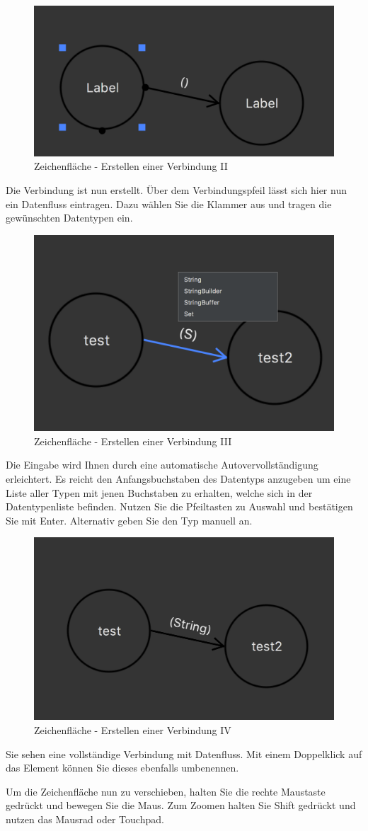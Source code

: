 \begin{figure}[H]
	\centering
	\includegraphics[width=.4\textwidth]{Zeichenflaeche_Basics2.png}
	\caption{Zeichenfläche - Erstellen einer Verbindung II}	
\end{figure}
Die Verbindung ist nun erstellt. Über dem Verbindungspfeil lässt sich hier nun ein Datenfluss eintragen. Dazu wählen Sie die Klammer aus und tragen die gewünschten Datentypen ein. 

\begin{figure}[H]
	\centering
	\includegraphics[width=.4\textwidth]{Zeichenflaeche_Basics3.png}
	\caption{Zeichenfläche - Erstellen einer Verbindung III}	
\end{figure}
Die Eingabe wird Ihnen durch eine automatische Autovervollständigung erleichtert. Es reicht den Anfangsbuchstaben des Datentyps anzugeben um eine Liste aller Typen mit jenen Buchstaben zu erhalten, welche sich in der Datentypenliste befinden. Nutzen Sie die Pfeiltasten zu Auswahl und bestätigen Sie mit Enter. Alternativ geben Sie den Typ manuell an.

\begin{figure}[H]
	\centering
	\includegraphics[width=.4\textwidth]{Zeichenflaeche_Basics4.png}
	\caption{Zeichenfläche - Erstellen einer Verbindung IV}	
\end{figure}
Sie sehen eine vollständige Verbindung mit Datenfluss. Mit einem Doppelklick auf das Element können Sie dieses ebenfalls umbenennen.

Um die Zeichenfläche nun zu verschieben, halten Sie die rechte Maustaste gedrückt und bewegen Sie die Maus. Zum Zoomen halten Sie Shift gedrückt und nutzen das Mausrad oder Touchpad.

